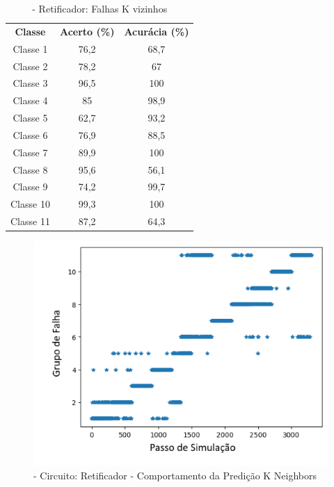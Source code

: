 \begin{itemize}
\begin{table}[ht]
\centering
\begin{tabular}{ccc}
\textbf{Classe} & \textbf{Acerto (\%)} & \textbf{Acurácia (\%)} \\
Classe 1        & 76,2                  & 68,7                    \\
Classe 2        & 78,2                  & 67                    \\
Classe 3        & 96,5                  & 100                    \\
Classe 4        & 85                  & 98,9                    \\
Classe 5        & 62,7                  & 93,2                    \\
Classe 6        & 76,9                  & 88,5                    \\
Classe 7        & 89,9                  & 100                    \\
Classe 8        & 95,6                  & 56,1                    \\
Classe 9        & 74,2                  & 99,7                    \\
Classe 10       & 99,3                  & 100                    \\
Classe 11       & 87,2                  & 64,3                                 
\end{tabular}
\caption{\label{tab:RetnKvizinhos}- Retificador: Falhas K vizinhos}
\end{table}


  \begin{figure}[H]
        \begin{center}
        \includegraphics[width=13cm]{./01_Pre_textuais/nonlin_figs/KNeighborsClassifier_Nonlinear_Rectfier_+_4bit_PRBS_[FALHA]_-_300_-_02sraw.png}
        \caption{\label{fig:KNeighborsClassifieRet}- Circuito: Retificador - Comportamento da Predição K Neighbors }
        \end{center}
        \end{figure}


\end{itemize}
